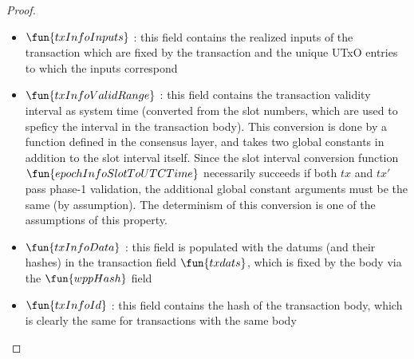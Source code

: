 \begin{property}
\begin{proof}
\begin{itemize}
\begin{itemize}
      \begin{itemize}
        \item $\fun{txInfoInputs}$ : this field contains the realized inputs of
        the transaction which are fixed by the transaction and the unique
        UTxO entries to which the inputs correspond

        \item $\fun{txInfoValidRange}$ : this field contains the transaction
        validity interval as system time (converted from the slot numbers, which are
        used to speficy the interval in the transaction body). This conversion is
        done by a function defined in the consensus layer, and takes two global
        constants in addition to the slot interval itself. Since the slot interval
        conversion function $\fun{epochInfoSlotToUTCTime}$ necessarily
        succeeds if both $tx$ and $tx'$ pass phase-1 validation, the additional
        global constant arguments must be the same (by assumption). The determinism of this conversion
        is one of the assumptions of this property.

        \item $\fun{txInfoData}$ : this field is populated with the datums (and their
        hashes) in the transaction field $\fun{txdats}$, which is fixed by the body
        via the $\fun{wppHash}$ field

        \item $\fun{txInfoId}$ : this field contains the hash of the transaction body,
        which is clearly the same for transactions with the same body
      \end{itemize}
    \end{itemize}

  \end{itemize}
\end{proof}
\end{property}

